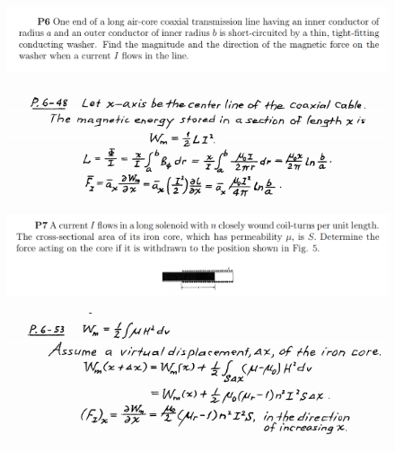 \documentclass[xcolor={dvipsnames}]{beamer}
\begin{document}
\begin{frame}
\begin{figure}[H]
	\centering
	\includegraphics[width=0.9\linewidth]{7_11.png}
\end{figure}
\pause
\begin{figure}[H]
	\centering
	\includegraphics[width=0.9\linewidth]{7_12.png}
\end{figure}
\end{frame}
\begin{frame}
\begin{figure}[H]
	\centering
	\includegraphics[width=0.9\linewidth]{7_13.png}
\end{figure}
\pause
\begin{figure}[H]
	\centering
	\includegraphics[width=0.9\linewidth]{7_14.png}
\end{figure}
\end{frame}
\end{document}
